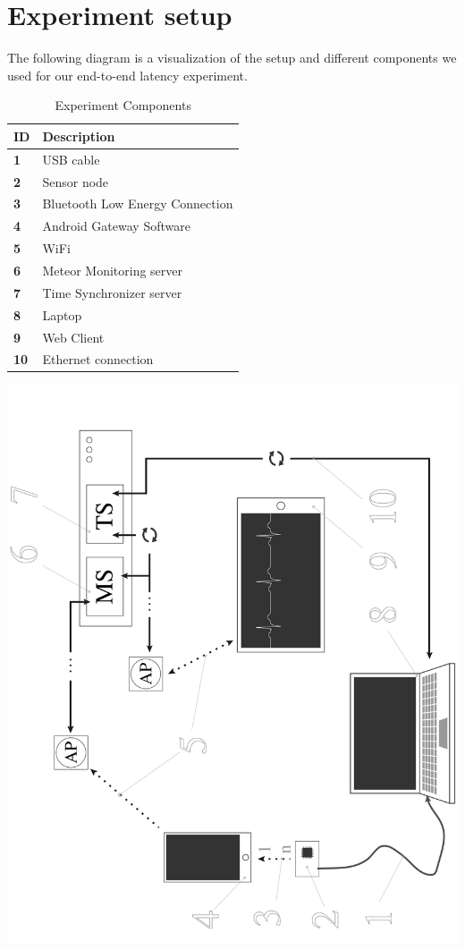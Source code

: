 \section{Experiment setup} %
\label{sec:experiment_setup}

The following diagram is a visualization of the setup and different components we used for our end-to-end latency experiment.\\
\newline



\begin{table}[H]
\centering
\caption{Experiment Components}
\label{tab:experimentComponents}
\renewcommand{\arraystretch}{1.2}
\begin{tabular}{@{}ll@{}}
\toprule
\textbf{ID} & \textbf{Description}            \\ \midrule
\textbf{1}  & USB cable                       \\
\textbf{2}  & Sensor node                     \\
\textbf{3}  & Bluetooth Low Energy Connection \\
\textbf{4}  & Android Gateway Software        \\
\textbf{5}  & WiFi                            \\
\textbf{6}  & Meteor Monitoring server        \\
\textbf{7}  & Time Synchronizer server        \\
\textbf{8}  & Laptop                          \\
\textbf{9}  & Web Client                      \\
\textbf{10} & Ethernet connection             \\ \bottomrule
\end{tabular}
\end{table}

\includegraphics[scale=.25]{img/figures/end-to-end4.png}